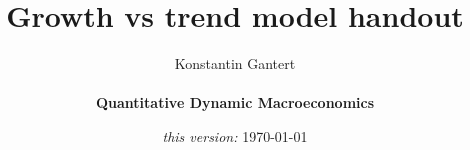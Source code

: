 \documentclass[10pt,c,aspectratio=1610,handout]{beamer}
\begin{document}
\title{Growth vs trend model handout}
\author[Konstantin Gantert]{\begin{large} Konstantin Gantert \end{large} \\ \textbf{Quantitative Dynamic Macroeconomics}}
\date{\textit{this version:} \today}

\beamertemplatenavigationsymbolsempty

{ 
\frame{\titlepage}}
 \addtocounter{framenumber}{-1}
\end{document}
